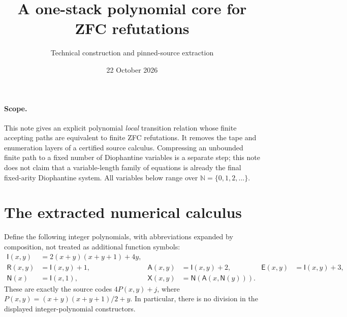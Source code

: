 \documentclass[11pt]{article}
\title{A one-stack polynomial core for ZFC refutations}
\author{Technical construction and pinned-source extraction}
\date{22 October 2026}
\newcommand{\N}{\mathbb N}
\newcommand{\Imp}{\mathsf I}
\newcommand{\Rel}{\mathsf R}
\newcommand{\All}{\mathsf A}
\newcommand{\Eq}{\mathsf E}
\newcommand{\Neg}{\mathsf N}
\newcommand{\Ex}{\mathsf X}
\begin{document}
\maketitle

\paragraph{Scope.}
This note gives an explicit polynomial \emph{local} transition relation whose
finite accepting paths are equivalent to finite ZFC refutations. It removes
the tape and enumeration layers of a certified source calculus. Compressing
an unbounded finite path to a fixed number of Diophantine variables is a
separate step; this note does not claim that a variable-length family of
equations is already the final fixed-arity Diophantine system.
All variables below range over \(\N=\{0,1,2,\ldots\}\).

\section{The extracted numerical calculus}

Define the following integer polynomials, with abbreviations expanded by
composition, not treated as additional function symbols:
\begin{align*}
 \Imp(x,y)&=2(x+y)(x+y+1)+4y,\\
 \Rel(x,y)&=\Imp(x,y)+1,&
 \All(x,y)&=\Imp(x,y)+2,&
 \Eq(x,y)&=\Imp(x,y)+3,\\
 \Neg(x)&=\Imp(x,1),&
 \Ex(x,y)&=\Neg(\All(x,\Neg(y))).
\end{align*}
These are exactly the source codes \(4P(x,y)+j\), where
\(P(x,y)=(x+y)(x+y+1)/2+y\). In particular, there is no division in
the displayed integer-polynomial constructors.
\end{document}
